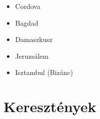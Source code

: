 \documentclass{article}
\begin{document}
\begin{itemize}
\begin{itemize}
        \item Dzsámi - imádság helye, nem szent hely (most 200\%-al nagyobb)
        \begin{itemize}
            \item Péntekenként használták
            \item Imafülke
            \item Tájolófal
        \end{itemize}
        
        \item Medresze - iskola 
        \begin{itemize}
            \item Felsőoktatási intézmény és Általános iskola is lehet
            \item Teológia tudományának iskolája
        \end{itemize}
        
        \item Ispotály - kórház
            \item Kümbet és türbe 
                \begin{itemize}
                    \item Sírhely
                    \item Türbe: szarkofág köré épített
                    
                    \item Kümbet: nagyobb síremlék 
                    \begin{itemize}
                        \item pl. Taj Mahal
                    \end{itemize}
            \end{itemize}
    \end{itemize}
    
    \item Cordova
    \item Bagdad
    \item Damaszkusz
    \item Jeruzsálem
    \item Isztambul (Bizánc)
    
\end{itemize}


\section{Keresztények}
\end{document}
